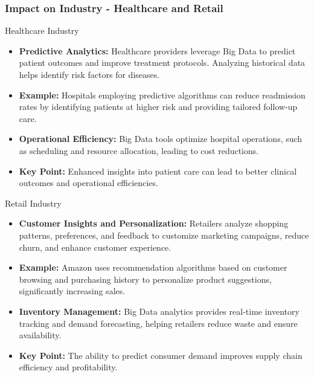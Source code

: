 \documentclass[aspectratio=169]{beamer}
\begin{document}
\begin{frame}[fragile]
    \frametitle{Impact on Industry - Healthcare and Retail}
    \begin{block}{Healthcare Industry}
        \begin{itemize}
            \item \textbf{Predictive Analytics:} 
            Healthcare providers leverage Big Data to predict patient outcomes and improve treatment protocols. Analyzing historical data helps identify risk factors for diseases.
            
            \item \textbf{Example:} 
            Hospitals employing predictive algorithms can reduce readmission rates by identifying patients at higher risk and providing tailored follow-up care.

            \item \textbf{Operational Efficiency:} 
            Big Data tools optimize hospital operations, such as scheduling and resource allocation, leading to cost reductions.

            \item \textbf{Key Point:} 
            Enhanced insights into patient care can lead to better clinical outcomes and operational efficiencies.
        \end{itemize}
    \end{block}

    \begin{block}{Retail Industry}
        \begin{itemize}
            \item \textbf{Customer Insights and Personalization:} 
            Retailers analyze shopping patterns, preferences, and feedback to customize marketing campaigns, reduce churn, and enhance customer experience.

            \item \textbf{Example:} 
            Amazon uses recommendation algorithms based on customer browsing and purchasing history to personalize product suggestions, significantly increasing sales.

            \item \textbf{Inventory Management:} 
            Big Data analytics provides real-time inventory tracking and demand forecasting, helping retailers reduce waste and ensure availability.

            \item \textbf{Key Point:} 
            The ability to predict consumer demand improves supply chain efficiency and profitability.
        \end{itemize}
    \end{block}
\end{frame}
\end{document}
